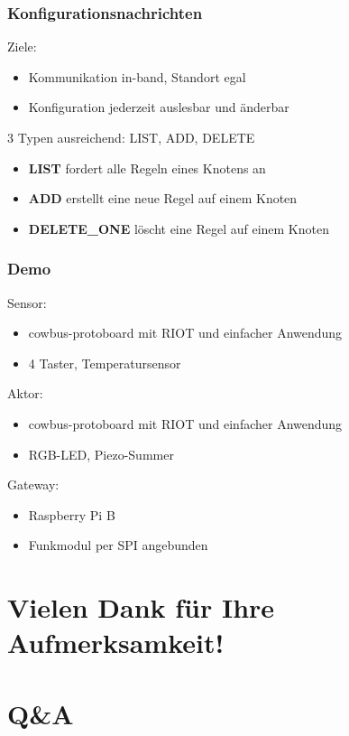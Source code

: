 \documentclass{beamer}
\newcommand{\customitemsep}{7pt}
\begin{document}
\begin{frame}
    \frametitle{Konfigurationsnachrichten}

        Ziele:
            \begin{itemize} \setlength{\itemsep}{\customitemsep}
                \item Kommunikation in-band, Standort egal
                \item Konfiguration jederzeit auslesbar und änderbar
            \end{itemize}

            \pause
        \vspace*{1cm}


        3 Typen ausreichend: LIST, ADD, DELETE
            \begin{itemize} \setlength{\itemsep}{\customitemsep}
                \item \textbf{LIST} fordert alle Regeln eines Knotens an
                \item \textbf{ADD} erstellt eine neue Regel auf einem Knoten
                \item \textbf{DELETE\_ONE} löscht eine Regel auf einem Knoten
            \end{itemize}
\end{frame}

\begin{frame}
    \frametitle{Demo}
        Sensor:
        \begin{itemize} \setlength{\itemsep}{\customitemsep}
            \item cowbus-protoboard mit RIOT und einfacher Anwendung
            \item 4 Taster, Temperatursensor
        \end{itemize}
        \vspace*{0.75cm}
        \pause

        Aktor:
        \begin{itemize} \setlength{\itemsep}{\customitemsep}
            \item cowbus-protoboard mit RIOT und einfacher Anwendung
            \item RGB-LED, Piezo-Summer
        \end{itemize}
        \vspace*{0.75cm}
        \pause

        Gateway:
        \begin{itemize} \setlength{\itemsep}{\customitemsep}
            \item Raspberry Pi B
            \item Funkmodul per SPI angebunden
        \end{itemize}
        \vspace*{1cm}
\end{frame}

\section{Vielen Dank für Ihre Aufmerksamkeit!}
\section{Q\&A}

{}



\end{document}

